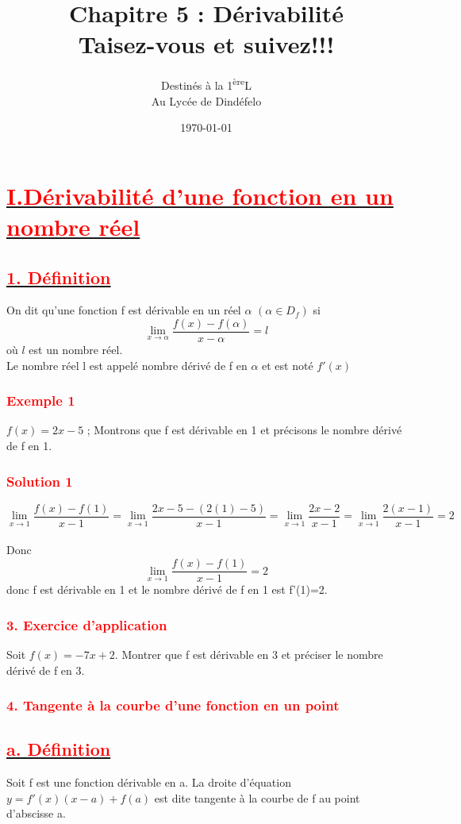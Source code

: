 \documentclass[12pt]{article}
\author{Destinés à la 1\textsuperscript{ère}L\\Au Lycée de Dindéfelo}
\title{\textbf{Chapitre 5 : Dérivabilité\\Taisez-vous et suivez!!!}}
\date{\today}
\begin{document}
\maketitle
\newpage
\section*{\underline{\textbf{\textcolor{red}{I.Dérivabilité d’une fonction en un nombre réel}}}}
\subsection*{\underline{\textbf{\textcolor{red}{1. Définition}}}}
On dit qu’une fonction f est dérivable en un réel $\alpha$ $(\alpha \in D_{f})$ si \[\lim_{x \to \alpha}\frac{f(x)-f(\alpha)}{x-\alpha}=\mathit{l}\] où $\mathit{l}$ est un nombre réel.\\
Le nombre réel l est appelé nombre dérivé de f en $\alpha$ et est noté $f'(x)$
\subsubsection*{\textcolor{red}{Exemple 1}}
$f(x)=2x-5$ ; Montrons que f est dérivable en 1 et précisons le nombre dérivé de f en 1.
\subsubsection*{\textcolor{red}{Solution 1}}
\[\lim_{x \to 1}\frac{f(x)-f(1)}{x-1}=\lim_{x \to 1}\frac{2x-5-(2(1)-5)}{x-1}=\lim_{x \to 1}\frac{2x-2}{x-1}=\lim_{x \to 1}\frac{2(x-1)}{x-1}=2\]\\
Donc \[\lim_{x \to 1}\frac{f(x)-f(1)}{x-1}=2\]donc f est dérivable en 1 et le nombre dérivé de f en 1 est f'(1)=2.
\subsubsection*{\textcolor{red}{3. Exercice d’application}}
Soit $f(x)=-7x+2$. Montrer que f est dérivable en 3 et préciser le nombre dérivé de f en 3.
\subsubsection*{\textcolor{red}{4. Tangente à la courbe d’une fonction en un point}}
\subsection*{\underline{\textbf{\textcolor{red}{a. Définition}}}}
Soit f est une fonction dérivable en a. La droite d’équation\\ $y=f'(x)(x-a)+f(a)$ est dite tangente à la courbe de f au point d’abscisse a.
\end{document}
